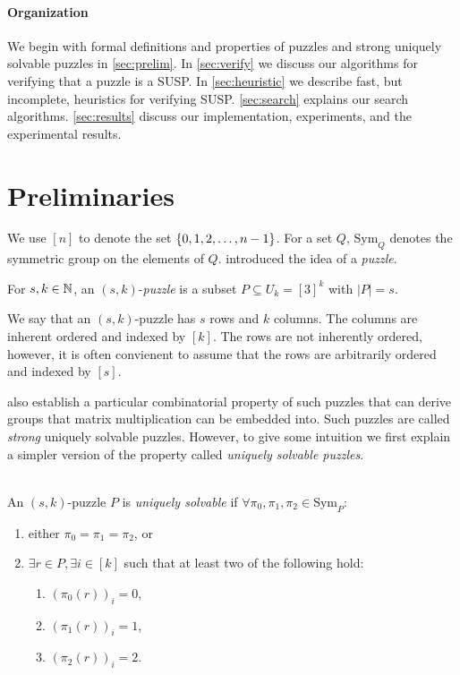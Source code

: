 \documentclass[11pt]{article}
\newcommand\sse{\subseteq}
\newcommand\Sym[1]{\ensuremath{\mathrm{Sym}_{#1}}}
\begin{document}
\paragraph{Organization}
We begin with formal definitions and properties of puzzles and strong
uniquely solvable puzzles in \autoref{sec:prelim}.  In
\autoref{sec:verify} we discuss our algorithms for verifying that a
puzzle is a SUSP.  In \autoref{sec:heuristic} we describe fast,
but incomplete, heuristics for verifying SUSP.
\autoref{sec:search} explains our search algorithms.
\autoref{sec:results} discuss our implementation, experiments, and
the experimental results.


\section{Preliminaries}
\label{sec:prelim}

\newcommand\ordset[1]{\ensuremath{[#1]}}

We use $\ordset{n}$ to denote the set $\left\{ 0,1,2,\ldots, n-1 \right\}$.  For
a set $Q$, $\Sym{Q}$ denotes the symmetric group on the elements of
$Q$.  \cite{cksu05} introduced the idea of a \emph{puzzle}.

\begin{definition}[Puzzle]
  For $s, k \in \mathbb{N}$, an $(s,k)$-\emph{puzzle} is a
  subset $P \sse U_k = \ordset{3}^k$ with $|P| = s$.
\end{definition}

We say that an $(s,k)$-puzzle has $s$ rows and $k$ columns.  The
columns are inherent ordered and indexed by $\ordset{k}$.  The rows are not
inherently ordered, however, it is often convienent to assume that the
rows are arbitrarily ordered and indexed by $\ordset{s}$.

\cite{cksu05} also establish a particular combinatorial property of
such puzzles that can derive groups that matrix multiplication can be
embedded into.  Such puzzles are called \emph{strong} uniquely
solvable puzzles.  However, to give some intuition we first explain a
simpler version of the property called \emph{uniquely solvable
  puzzles}.

\begin{definition}
  \label{def:strong-USP}
  ~\\An $(s,k)$-puzzle $P$ is \emph{uniquely solvable} if
  $\forall \pi_0, \pi_1, \pi_2 \in \Sym{P}:$
  \begin{enumerate}
  \item either $\pi_0 = \pi_1 = \pi_2$, or
  \item $\exists r \in P, \exists i \in \ordset{k}$ such that at least two
    of the following hold:
    \begin{enumerate}
    \item $(\pi_0(r))_i = 0$,
    \item $(\pi_1(r))_i = 1$,
    \item $(\pi_2(r))_i = 2$.
    \end{enumerate}
  \end{enumerate}
\end{definition}
\end{document}
